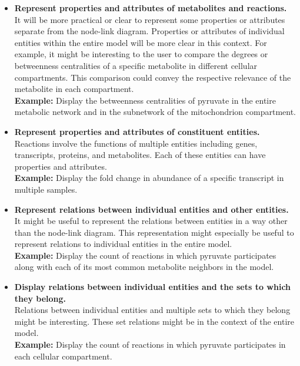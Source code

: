 \begin{enumerate}
\begin{itemize}

\item \textbf{Represent properties and attributes of metabolites and reactions.}
\\ It will be more practical or clear to represent some properties or attributes separate from the node-link diagram.
Properties or attributes of individual entities within the entire model will be more clear in this context.
For example, it might be interesting to the user to compare the degrees or betweenness centralities of a specific metabolite in different cellular compartments.
This comparison could convey the respective relevance of the metabolite in each compartment.
\\ \textbf{Example:} Display the betweenness centralities of pyruvate in the entire metabolic network and in the subnetwork of the mitochondrion compartment.

\item \textbf{Represent properties and attributes of constituent entities.}
\\ Reactions involve the functions of multiple entities including genes, transcripts, proteins, and metabolites.
Each of these entities can have properties and attributes.
\\ \textbf{Example:} Display the fold change in abundance of a specific transcript in multiple samples.

\item \textbf{Represent relations between individual entities and other entities.}
\\ It might be useful to represent the relations between entities in a way other than the node-link diagram.
This representation might especially be useful to represent relations to individual entities in the entire model.
\\ \textbf{Example:} Display the count of reactions in which pyruvate participates along with each of its most common metabolite neighbors in the model.

\item \textbf{Display relations between individual entities and the sets to which they belong.}
\\ Relations between individual entities and multiple sets to which they belong might be interesting.
These set relations might be in the context of the entire model.
\\ \textbf{Example:} Display the count of reactions in which pyruvate participates in each cellular compartment.


\end{itemize}
\end{enumerate}
